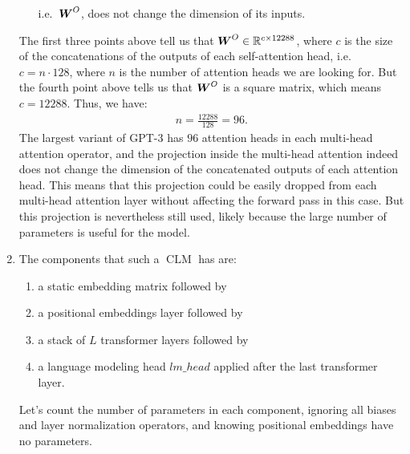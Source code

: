 \documentclass[11pt,a4paper]{article}
\newcommand\op[1]{\operatorname{#1}}
\begin{document}
\begin{enumerate}[label=(\alph*)]
\begin{enumerate}[label=(\roman*)]
                    i.e.\ ${\boldsymbol{W}}^O$, does not change the dimension of its inputs.
          \end{enumerate}
          The first three points above tell us that
          ${\boldsymbol{W}}^O\in\mathbb{R}^{c\times 12288}$, where $c$ is the size of the
          concatenations of the outputs of each self-attention head, i.e.\
          $c = n\cdot 128$, where $n$ is the number of attention heads we are
          looking for.
          But the fourth point above tells us that ${\boldsymbol{W}}^O$ is a square matrix,
          which means $c = 12288$.
          Thus, we have:
          \begin{align}
              n = \frac{12288}{128} = 96.
          \end{align}
          The largest variant of GPT-3 has $96$ attention heads in each
          multi-head attention operator, and the projection inside the
          multi-head attention indeed does not change the dimension of the
          concatenated outputs of each attention head.
          This means that this projection could be easily dropped from each
          multi-head attention layer without affecting the forward pass in this
          case.
          But this projection is nevertheless still used, likely because the
          large number of parameters is useful for the model.
    \item The components that such a $\op{CLM}$ has are:
          \begin{enumerate}[label=(\roman*)]
              \item a static embedding matrix followed by
              \item a positional embeddings layer followed by
              \item a stack of $L$ transformer layers followed by
              \item a language modeling head $lm\_head$ applied after the last
                    transformer layer.
          \end{enumerate}
          Let's count the number of parameters in each component, ignoring
          all biases and layer normalization operators, and knowing positional
          embeddings have no parameters.


\end{enumerate}
\end{document}
